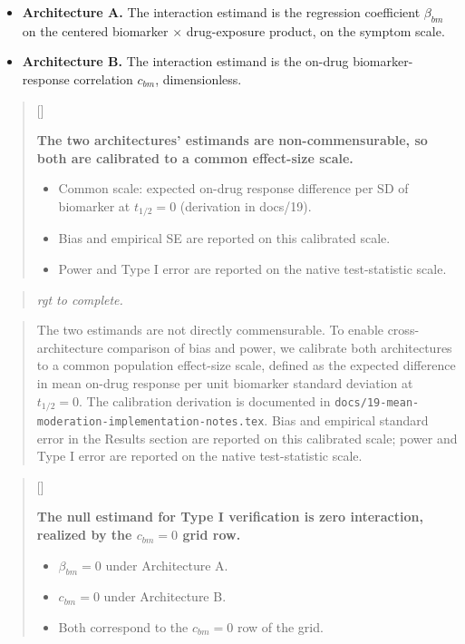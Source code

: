 \documentclass[
  11pt,
]{article}
\providecommand{\tightlist}{%
  \setlength{\itemsep}{0pt}\setlength{\parskip}{0pt}}
\newcounter{pgraph}
\newenvironment{bullets}{%
  \stepcounter{pgraph}%
  \begin{quote}\small\sffamily\color[gray]{0.30}%
  {\normalfont\scriptsize\color[gray]{0.58}[\thepgraph]\enspace}}{%
  \end{quote}}
\newenvironment{rgt}{%
  \begin{quote}\small\itshape\color[RGB]{20,60,160}}{%
  \end{quote}}
\newenvironment{orig}{%
  \begin{quote}\normalsize\color[gray]{0.55}}{%
  \end{quote}}
\begin{document}
\begin{itemize}
\tightlist
\item
  \textbf{Architecture A.} The interaction estimand is the regression
  coefficient \(\beta_{bm}\) on the centered biomarker \(\times\)
  drug-exposure product, on the symptom scale.
\item
  \textbf{Architecture B.} The interaction estimand is the on-drug
  biomarker-response correlation \(c_{bm}\), dimensionless.
\end{itemize}

\begin{bullets}

\textbf{The two architectures' estimands are non-commensurable, so
both are calibrated to a common effect-size scale.}

\begin{itemize}\setlength{\itemsep}{2pt}\setlength{\parskip}{0pt}
\item Common scale: expected on-drug response difference per SD of
biomarker at $t_{1/2} = 0$ (derivation in docs/19).
\item Bias and empirical SE are reported on this calibrated scale.
\item Power and Type I error are reported on the native
test-statistic scale.
\end{itemize}

\end{bullets}

\begin{rgt}
rgt to complete.

\end{rgt}

\begin{orig}
The two estimands are not directly commensurable. To enable
cross-architecture comparison of bias and power, we calibrate
both architectures to a common population effect-size scale,
defined as the expected difference in mean on-drug response per
unit biomarker standard deviation at \(t_{1/2} = 0\). The
calibration derivation is documented in
\texttt{docs/19-mean-moderation-implementation-notes.tex}. Bias and
empirical standard error in the Results section are reported on
this calibrated scale; power and Type I error are reported on
the native test-statistic scale.

\end{orig}

\begin{bullets}

\textbf{The null estimand for Type I verification is zero
interaction, realized by the $c_{bm} = 0$ grid row.}

\begin{itemize}\setlength{\itemsep}{2pt}\setlength{\parskip}{0pt}
\item $\beta_{bm} = 0$ under Architecture A.
\item $c_{bm} = 0$ under Architecture B.
\item Both correspond to the $c_{bm} = 0$ row of the grid.
\end{itemize}

\end{bullets}
\end{document}

